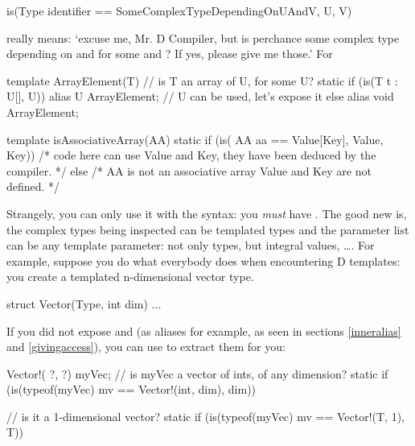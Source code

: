 \begin{dcode}
is(Type identifier == SomeComplexTypeDependingOnUAndV, U, V)
\end{dcode}

really means: `excuse me, Mr. D Compiler, but is  perchance some complex type depending on  and  for some  and ? If yes, please give me those.'
For 

\begin{dcode}
template ArrayElement(T)
{
    // is T an array of U, for some U?
    static if (is(T t : U[], U)) 
        alias U ArrayElement; // U can be used, let's expose it
    else
        alias void ArrayElement;
}

template isAssociativeArray(AA)
{
    static if (is( AA aa == Value[Key], Value, Key))  
        /* code here can use Value and Key, 
           they have been deduced by the compiler. */ 
    else
        /* AA is not an associative array
          Value and Key are not defined. */
}
\end{dcode}

Strangely, you can only use it with the  syntax: you \emph{must} have . The good new is, the complex types being inspected can be templated types and the parameter list can be any template parameter: not only types, but integral values, \ldots.
For example, suppose you do what everybody does when encountering D templates: you create a templated  n-dimensional vector type.

\begin{dcode}
struct Vector(Type, int dim) { ... }
\end{dcode}

If you did not expose  and  (as aliases for example, as seen in sections \ref{inneralias} and \ref{givingaccess}), you can use  to extract them for you:

\begin{dcode}
Vector!( ?, ?) myVec;
// is myVec a vector of ints, of any dimension?
static if (is(typeof(myVec) mv == Vector!(int, dim), dim))

// is it a 1-dimensional vector?
static if (is(typeof(myVec) mv == Vector!(T, 1), T))
\end{dcode}


